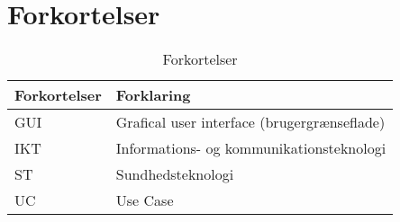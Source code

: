 \chapter{Forkortelser}

\begin{table}[h]
\centering
\begin{tabular}{|l| p{}|}
\hline
\textbf{Forkortelser} &  \textbf{Forklaring} \\\hline
GUI & Grafical user interface (brugergrænseflade) \\\hline
IKT & Informations- og kommunikationsteknologi \\\hline
ST  & Sundhedsteknologi \\\hline
UC  & Use Case \\\hline
\end{tabular}
\caption{Forkortelser}
\end{table}

\vspace{5cm}
